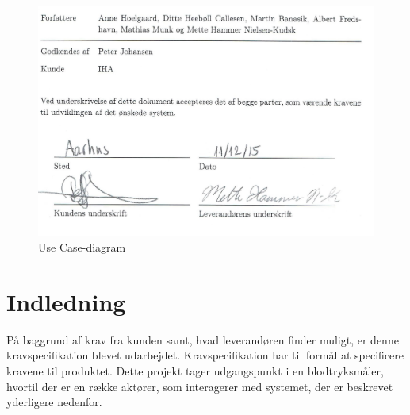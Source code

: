 

\begin{figure}[H]
	\centering
	\includegraphics[width=1.0\textwidth]{Figurer/underskriftGodkendt}
	\caption{Use Case-diagram}
	\label{fig:Use Cases}
\end{figure}


\newpage
\section{Indledning}
På baggrund af krav fra kunden samt, hvad leverandøren finder muligt, er denne kravspecifikation blevet udarbejdet. Kravspecifikation har til formål at specificere kravene til produktet. Dette projekt tager udgangspunkt i en blodtryksmåler, hvortil der er en række aktører, som interagerer med systemet, der er beskrevet yderligere nedenfor.

